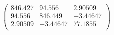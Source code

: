 \documentclass{article}
\begin{document}
\[\left(
\begin{array}{ccc}
 846.427 & 94.556 & 2.90509 \\
 94.556 & 846.449 & -3.44647 \\
 2.90509 & -3.44647 & 77.1855 \\
\end{array}
\right)\]
\end{document}
